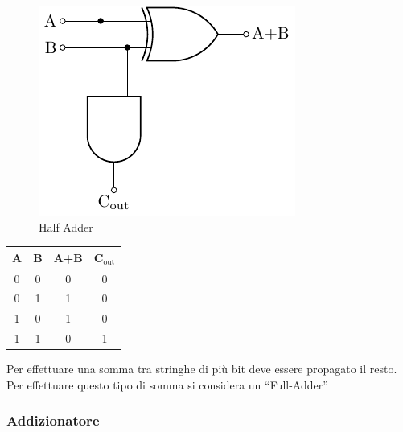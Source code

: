 \documentclass{article}
\numberwithin{equation}{subsection}
\begin{document}
\begin{figure}[H]%
    \centering%
    \includegraphics[scale=0.9]{half-adder.pdf}%
    \caption{Half Adder}
\end{figure}
\begin{center}
    \begin{tabular}{|c|c||c|c|}
        \hline
        A&B&A+B&C$_{\mathrm{out}}$\\
        \hline\hline
        0&0&0&0\\
        \hline
        0&1&1&0\\
        \hline
        1&0&1&0\\
        \hline
        1&1&0&1\\
        \hline
    \end{tabular}
\end{center}
Per effettuare una somma tra stringhe di più bit deve essere propagato il resto. Per effettuare questo tipo di somma si considera un ``Full-Adder''

\subsubsection{Addizionatore}
\end{document}
